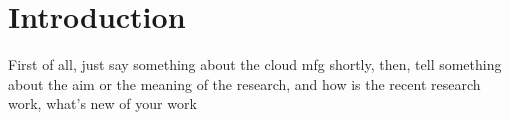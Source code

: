 \section{Introduction}
First of all, just say something about the cloud mfg shortly,
then, tell something about the aim or the meaning of the research,
and how is the recent research work, what's new of your work
